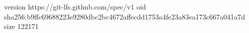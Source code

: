 version https://git-lfs.github.com/spec/v1
oid sha256:b9ffc69688223e9280dbc2bc4672affecdd1753a4fe23a83ea173c667a041a7d
size 122171
